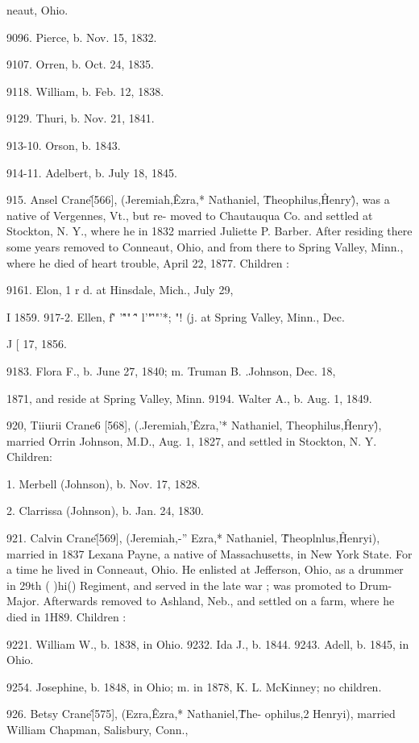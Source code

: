\documentclass{book}
\begin{document}
neaut, Ohio. 

9096. Pierce, b. Nov. 15, 1832. 

9107. Orren, b. Oct. 24, 1835. 

9118. William, b. Feb. 12, 1838. 

9129. Thuri, b. Nov. 21, 1841. 

913-10. Orson, b. 1843. 

914-11. Adelbert, b. July 18, 1845. 

915. Ansel Crane\^ [566], (Jeremiah,\^ Ezra,* Nathaniel, \^ 
Theophilus,\^ Henry\^), was a native of Vergennes, Vt., but re- 
moved to Chautauqua Co. and settled at Stockton, N. Y., where 
he in 1832 married Juliette P. Barber. After residing there some 
years removed to Conneaut, Ohio, and from there to Spring Valley, 
Minn., where he died of heart trouble, April 22, 1877. Children : 

9161. Elon, 1 r d. at Hinsdale, Mich., July 29, 

I 1859. 
917-2. Ellen, f\^' '\^"" \^\^' l'"\^'"'*; "! (j. at Spring Valley, Minn., Dec. 

J [ 17, 1856. 

9183. Flora F., b. June 27, 1840; m. Truman B. .Johnson, Dec. 18, 

1871, and reside at Spring Valley, Minn. 
9194. Walter A., b. Aug. 1, 1849. 

920, Tiiurii Crane6 [568], (.Jeremiah,'\^ Ezra,'* Nathaniel,  
Theophilus,\^ Henry\^), married Orrin Johnson, M.D., Aug. 1, 
1827, and settled in Stockton, N. Y. Children: 

1. Merbell (Johnson), b. Nov. 17, 1828. 

2. Clarrissa (Johnson), b. Jan. 24, 1830. 

921. Calvin Crane\^ [569], (Jeremiah,-'' Ezra,* Nathaniel, \^ 
Theoplnlus,\^ Henryi), married in 1837 Lexana Payne, a native 
of Massachusetts, in New York State. For a time he lived in 
Conneaut, Ohio. He enlisted at Jefferson, Ohio, as a drummer 
in 29th ( )hi() Regiment, and served in the late war ; was promoted 
to Drum-Major. Afterwards removed to Ashland, Neb., and 
settled on a farm, where he died in 1H89. Children : 

9221. William W., b. 1838, in Ohio. 
9232. Ida J., b. 1844. 
9243. Adell, b. 1845, in Ohio. 

9254. Josephine, b. 1848, in Ohio; m. in 1878, K. L. McKinney; no 
children. 

926. Betsy Crane\^ [575], (Ezra,\^ Ezra,* Nathaniel,\^ The- 
ophilus,2 Henryi), married William Chapman, Salisbury, Conn., 
\end{document}
